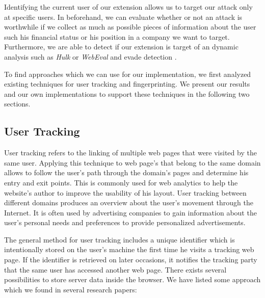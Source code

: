 	Identifying the current user of our extension allows us to target our attack only at specific users. In beforehand, we can evaluate whether or not an attack is worthwhile if we collect as much as possible pieces of information about the user such his financial status or his position in a company we want to target. Furthermore, we are able to detect if our extension is target of an dynamic analysis such as \textit{Hulk} or \textit{WebEval} and evade detection \cite{184485,190984}.
	
	To find approaches which we can use for our implementation, we first analyzed existing techniques for user tracking and fingerprinting. We present our results and our own implementations to support these techniques in the following two sections.
	
\subsection{User Tracking}

	User tracking refers to the linking of multiple web pages that were visited by the same user. Applying this technique to web page's that belong to the same domain allows to follow the user's path through the domain's pages and determine his entry and exit points. This is commonly used for web analytics to help the website's author to improve the usability of his layout. User tracking between different domains produces an overview about the user's movement through the Internet. It is often used by advertising companies to gain information about the user's personal needs and preferences to provide personalized advertisements. 
		
	The general method for user tracking includes a unique identifier which is intentionally stored on the user's machine the first time he visits a tracking web page. If the identifier is retrieved on later occasions, it notifies the tracking party that the same user has accessed another web page. There exists several possibilities to store server data inside the browser. We have listed some approach which we found in several research papers:
	
%		
%		
	
